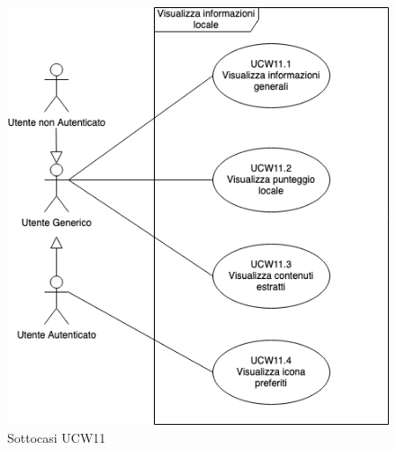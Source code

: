 \begin{figure}[!h]
	\centering
		\includegraphics[scale=0.5]{UC_images/UCW11-.png} 
		\caption{Sottocasi UCW11}
\end{figure}  


